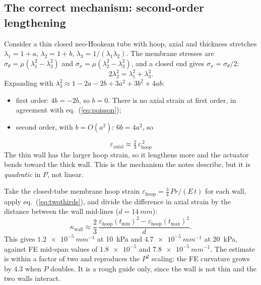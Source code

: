 \documentclass[11pt,a4paper]{article}
\numberwithin{equation}{section}
\newcommand{\tmin}{t_{\min}}
\newcommand{\tmax}{t_{\max}}
\begin{document}
\subsection{The correct mechanism: second-order lengthening}
Consider a thin closed neo-Hookean tube with hoop, axial and thickness stretches $\lambda_1=1+a$, $\lambda_2=1+b$, $\lambda_3=1/(\lambda_1\lambda_2)$.
The membrane stresses are $\sigma_\theta=\mu(\lambda_1^2-\lambda_3^2)$ and $\sigma_x=\mu(\lambda_2^2-\lambda_3^2)$, and a closed end gives $\sigma_x=\sigma_\theta/2$:
\begin{equation}
2\lambda_2^2 = \lambda_1^2 + \lambda_3^2 .
\end{equation}
Expanding with $\lambda_3^2 \approx 1-2a-2b+3a^2+3b^2+4ab$:
\begin{itemize}[nosep]
\item first order: $4b = -2b$, so $b=0$. There is no axial strain at first order, in agreement with eq.~(\ref{eq:poisson});
\item second order, with $b=O(a^2)$: $6b = 4a^2$, so
\end{itemize}
\begin{equation}
\boxed{\;\varepsilon_{\text{axial}} \approx \tfrac{2}{3}\,\varepsilon_{\text{hoop}}^{\,2}\;} \label{eq:twothirds}
\end{equation}
The thin wall has the larger hoop strain, so it lengthens more and the actuator bends toward the thick wall. This is the
mechanism the notes describe, but it is \emph{quadratic} in $P$, not linear.

\begin{remark}
Take the closed-tube membrane hoop strain $\varepsilon_{\text{hoop}} = \tfrac{3}{4}\,P r/(E\,t)$ for each wall, apply eq.~(\ref{eq:twothirds}), and divide the difference in axial strain by the distance between
the wall mid-lines ($d = \SI{14}{mm}$):
\[
\kappa_{\text{wall}} \approx \frac{2}{3}\,\frac{\varepsilon_{\text{hoop}}(\tmin)^2-\varepsilon_{\text{hoop}}(\tmax)^2}{d}.
\]
This gives $\SI{1.2e-5}{mm^{-1}}$ at \SI{10}{kPa} and $\SI{4.7e-5}{mm^{-1}}$ at \SI{20}{kPa}, against FE mid-span values of
$\num{1.8e-5}$ and $\SI{7.8e-5}{mm^{-1}}$. The estimate is within a factor of two and reproduces the $P^2$ scaling: the FE curvature grows by 4.3 when $P$ doubles.
It is a rough guide only, since the wall is not thin and the two walls interact.
\end{remark}
\end{document}
